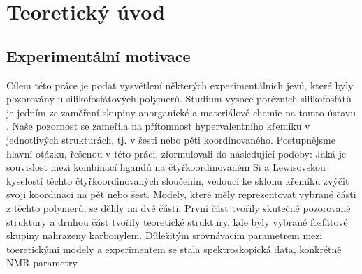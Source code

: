 \documentclass[
  digital, %
  table,   %
  lof,     %
  lot,     %
]{fithesis3}
\begin{document}
\chapter{Teoretický úvod}

\section{Experimentální motivace}
Cílem této práce je podat vysvětlení některých experimentálních jevů, které byly pozorovány u silikofosfátových polymerů. Studium vysoce porézních silikofosfátů je jedním ze zaměření skupiny anorganické a materiálové chemie na tomto ústavu .
Naše pozornost se zameřila na přítomnost hypervalentního křemíku v jednotlivých strukturách, tj. v šesti nebo pěti koordinovaného. Postupnějsme hlavní otázku, řešenou v této práci, zformulovali do následující podoby: Jaká je souvislost mezi kombinací ligandů na čtyřkoordinovaném Si a Lewisovskou kyselostí těchto čtyřkoordinovaných sloučenin, vedoucí ke sklonu křemíku zvýčit svoji koordinaci na pět nebo šest. Modely, které měly reprezentovat vybrané části z těchto polymerů, se dělily na dvě části. První část tvořily skutečně pozorované struktury a druhou část tvořily teoretické struktury, kde byly vybrané fosfátové skupiny nahrazeny karbonylem. Důležitým srovnávacím parametrem mezi toeretickými modely a experimentem se stala spektroskopická data, konkrétně NMR parametry.
\end{document}
